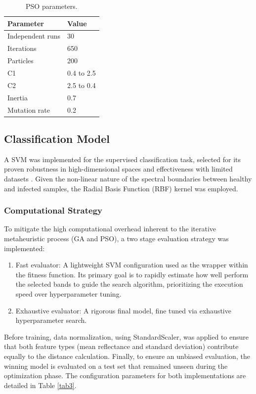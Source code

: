 \documentclass[runningheads]{llncs}
\begin{document}
\begin{table}
    \centering
    \caption{PSO parameters.\label{tab2}}
    \begin{tabular}{ll}
        \hline
        {\bfseries Parameter} & {\bfseries Value}\\
        \hline
        Independent runs & 30 \\
        Iterations & 650\\
        Particles & 200\\
        C1 & 0.4 to 2.5\\
        C2 & 2.5 to 0.4\\
        Inertia & 0.7\\
        Mutation rate & 0.2\\
        \hline
    \end{tabular}           
\end{table}

\subsection{Classification Model}
A SVM was implemented for the supervised classification task, selected for its proven robustness in high-dimensional spaces and effectiveness with limited datasets \cite{nagasubramanian_hyperspectral_2018, musci_ice_2020}. 
Given the non-linear nature of the spectral boundaries between healthy and infected samples, the Radial Basis Function (RBF) kernel was employed.

\subsubsection{Computational Strategy}
To mitigate the high computational overhead inherent to the iterative metaheuristic process (GA and PSO), a two stage evaluation strategy was implemented:
\begin{enumerate}
    \item Fast evaluator: A lightweight SVM configuration used as the wrapper within the fitness function. Its primary goal is to rapidly estimate how well perform the selected bands to guide the search algorithm, prioritizing the execution speed over hyperparameter tuning.
    \item Exhaustive evaluator: A rigorous final model, fine tuned via exhaustive hyperparameter search.
\end{enumerate}

Before training, data normalization, using StandardScaler, was applied to ensure that both feature types (mean reflectance and standard deviation) contribute equally to the distance calculation. 
Finally, to ensure an unbiased evaluation, the winning model is evaluated on a test set that remained unseen during the optimization phase. 
The configuration parameters for both implementations are detailed in Table \ref{tab3}.
\end{document}

